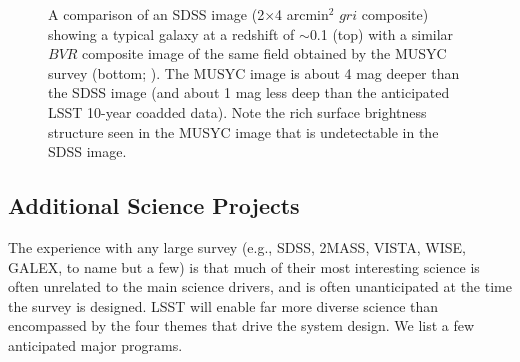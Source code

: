 \begin{figure}
\caption{
A comparison of an SDSS image (2$\times$4 arcmin$^2$ $gri$ composite) showing a typical galaxy at
a redshift of $\sim$0.1 (top) with a similar $BVR$ composite image of the same field obtained by the MUSYC survey (bottom;
\cite{Gawiser2006}). The MUSYC image is about 4 mag deeper than the SDSS image (and about 1 mag less deep
than the anticipated LSST 10-year coadded data). Note the rich surface brightness structure seen in the MUSYC
image that is undetectable in the SDSS image.}
\label{Fig:musyc}
\end{figure}


\subsection{  Additional Science Projects}

The experience with any large survey (e.g., SDSS, 2MASS, VISTA, WISE, GALEX, to name but a
few) is that much of their most interesting science is often unrelated to
the main science drivers, and is often unanticipated at the time the survey is
designed. LSST will enable far more diverse science than encompassed by the
four themes that drive the system design. We list a few anticipated major
programs.

